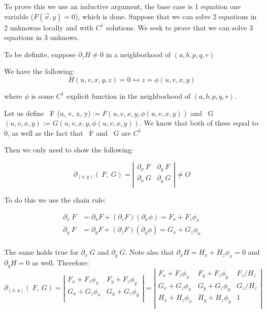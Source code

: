 \documentclass[11 pt, twoside]{article}
\begin{document}
To prove this we use an inductive argument, the base case is 1 equation one
variable ($F(\vec{x}, y) = 0$), which is done. Suppose that we can solve 2
equations in 2 unknowns locally and with $C^1$ solutions. We seek to prove that
we can solve 3 equations in 3 unknows.

To be definite, suppose $\partial_z H \neq 0$ in a neighborhood of $(a, b, p, q, r)$

We have the following:
$$H(u, v, x, y, z) = 0 \longleftrightarrow z = \phi(u, v, x, y)$$

where $\phi$ is some $C^1$ explicit function in the neighborhood of $(a, b, p,
q, r)$.

Let us define ~F (u, v, x, y)$ := F(u, v, x, y, \phi(u, v, x, y))$ and ~G$
(u, v, x, y) := G(u, v, x, y, \phi(u, v, x, y))$. We know that both of these
equal to 0, as well as the fact that ~F and ~G are $C^1$

Then we only need to show the following:

\[
\partial_{(x, y)} (~F, ~G) =
\left|\begin{array}{cc}
\partial_x ~F & \partial_y ~F\\
\partial_x ~G & \partial_y ~G\\
\end{array}\right| \neq O
\]

To do this we use the chain rule:

\begin{align*}
\partial_x ~F &= \partial_x F + (\partial_z F)(\partial_x \phi) = F_x +
F_z \phi_x\\
\partial_y ~F &= \partial_y F + (\partial_z F)(\partial_y \phi) = G_x +
G_z \phi_x\\
\end{align*}

The same holds true for $\partial_x ~G$ and $\partial_y ~G$. Note also
that $\partial_x H = H_x + H_z \phi_x = 0$ and $\partial_y H = 0$ as well.
Therefore:
\[
\partial_{(x, y)} (~F, ~G) = 
\left|\begin{array}{ccc}
F_x + F_z \phi_x & F_y + F_z \phi_y \\
G_x + G_z \phi_x & G_y + G_z \phi_y \\
\end{array}\right| =
\left|\begin{array}{ccc}
F_x + F_z \phi_x & F_y + F_z \phi_y & F_z/H_z\\
G_x + G_z \phi_x & G_y + G_z \phi_y & G_z/H_z\\
H_x + H_z \phi_x & H_y + H_z \phi_y & 1\\
\end{array}\right|
\]
\end{document}
